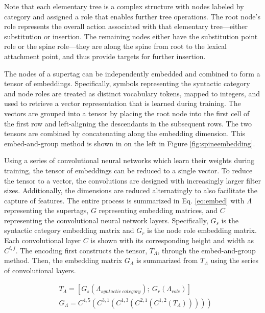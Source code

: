 \documentclass[11pt]{article}
\begin{document}
Note that each elementary tree is a complex structure with nodes
labeled by category and assigned a role that enables further tree
operations.
%
The root node's role represents the overall action associated with
that elementary tree---either substitution or insertion.
%
The remaining nodes either have the substitution point role or the
spine role---they are along the spine from root to the lexical
attachment point, and thus provide targets for further insertion.

The nodes of a supertag can be independently embedded and combined to form a
tensor of embeddings.
%
Specifically, symbols representing the syntactic category and node roles are treated as
distinct vocabulary tokens, mapped to integers, and used to retrieve a vector
representation that is learned during training.
%
The vectors are grouped into a tensor by placing the root node into the
first cell of the first row and left-aligning the descendants in the subsequent rows.
%
The two tensors are combined by concatenating along the embedding dimension.
%
This embed-and-group method is shown in on the left in Figure \ref{fig:spineembedding}.


Using a series of convolutional neural networks which learn their weights during training, the tensor of embeddings can be reduced to a single vector.
%
To reduce the tensor to a vector, the convolutions are designed with increasingly larger filter sizes.
%
Additionally, the dimensions are reduced alternatingly to also facilitate the capture of features.
%
The entire process is summarized in Eq. \ref{eq:embed} with $\Lambda$ representing the supertags, $G$ representing embedding matrices, and
$C$ representing the convolutional neural network layers.
%
Specifically, $G_s$ is the syntactic category embedding matrix and
$G_r$ is the node role embedding matrix.
%
Each convolutional layer $C$ is shown with its corresponding height and width as $C^{i,j}$.
%
The encoding first constructs the tensor, $T_\Lambda$, through the embed-and-group method.
%
Then, the embedding matrix $G_\Lambda$ is summarized from $T_\Lambda$ using the
series of convolutional layers.


\begin{align}
& T_\Lambda = [G_s(\Lambda_{syntactic~category});~G_r(\Lambda_{role})] \nonumber \\
& G_\Lambda = C^{4,5}(C^{3,1}(C^{1,3}(C^{2,1}(C^{1,2}(T_\Lambda))))) \label{eq:embed}
\end{align}
\end{document}
